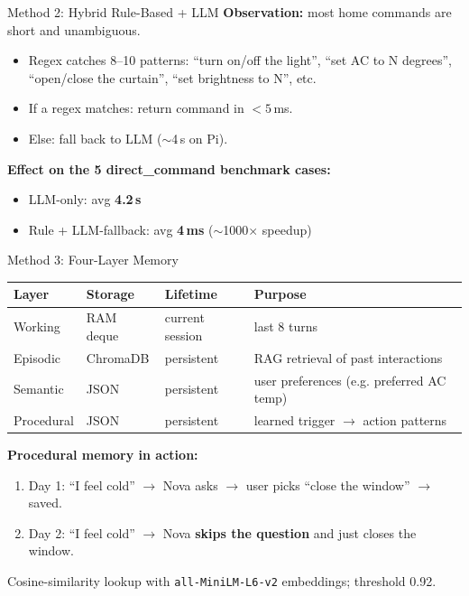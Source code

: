 \documentclass[aspectratio=169]{beamer}
\begin{document}
\begin{frame}{Method 2: Hybrid Rule-Based + LLM}
\textbf{Observation:} most home commands are short and unambiguous.
\vspace{0.3em}
\begin{itemize}
\item Regex catches 8--10 patterns: ``turn on/off the light'', ``set AC to N degrees'', ``open/close the curtain'', ``set brightness to N'', etc.
\item If a regex matches: return command in $<5$\,ms.
\item Else: fall back to LLM ($\sim$4\,s on Pi).
\end{itemize}
\vspace{0.3em}
\textbf{Effect on the 5 direct\_command benchmark cases:}
\begin{itemize}
\item LLM-only: avg \textbf{4.2\,s}
\item Rule + LLM-fallback: avg \textbf{4\,ms} ($\sim$1000$\times$ speedup)
\end{itemize}
\end{frame}

\begin{frame}{Method 3: Four-Layer Memory}
\begin{table}[h]
\centering
\scriptsize
\begin{tabular}{llll}
\toprule
\textbf{Layer} & \textbf{Storage} & \textbf{Lifetime} & \textbf{Purpose} \\
\midrule
Working & RAM deque & current session & last 8 turns \\
Episodic & ChromaDB & persistent & RAG retrieval of past interactions \\
Semantic & JSON & persistent & user preferences (e.g. preferred AC temp) \\
Procedural & JSON & persistent & learned trigger $\rightarrow$ action patterns \\
\bottomrule
\end{tabular}
\end{table}
\vspace{0.5em}
\textbf{Procedural memory in action:}
\begin{enumerate}
\item Day 1: ``I feel cold'' $\rightarrow$ Nova asks $\rightarrow$ user picks ``close the window'' $\rightarrow$ saved.
\item Day 2: ``I feel cold'' $\rightarrow$ Nova \textbf{skips the question} and just closes the window.
\end{enumerate}
Cosine-similarity lookup with \texttt{all-MiniLM-L6-v2} embeddings; threshold 0.92.
\end{frame}
\end{document}
